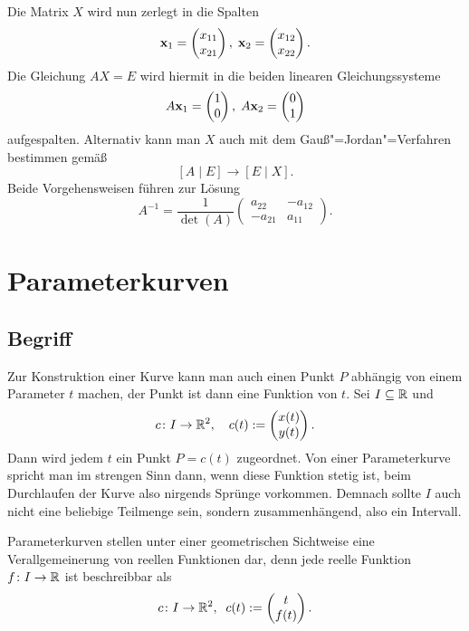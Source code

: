 Die Matrix $X$ wird nun zerlegt in die Spalten%
\[\mathbf{x}_1 = \begin{pmatrix}x_{11}\\ x_{21}\end{pmatrix},\;
\mathbf{x}_2 = \begin{pmatrix}x_{12}\\ x_{22}\end{pmatrix}.\]
Die Gleichung $AX=E$ wird hiermit in die beiden linearen
Gleichungssysteme%
\[A\mathbf{x}_1 = \begin{pmatrix}1\\ 0\end{pmatrix},\;
A\mathbf{x}_2 = \begin{pmatrix}0\\ 1\end{pmatrix}\]
aufgespalten. Alternativ kann man $X$ auch mit dem
Gauß"=Jordan"=Verfahren bestimmen gemäß%
\[[A\mid E] \rightarrow [E\mid X].\]
Beide Vorgehensweisen führen zur Lösung
\[A^{-1} = \frac{1}{\det(A)}\begin{pmatrix}
a_{22} & -a_{12}\\
-a_{21} & a_{11}
\end{pmatrix}.\]

\section{Parameterkurven}
\subsection{Begriff}
Zur Konstruktion einer Kurve kann man auch einen Punkt $P$ abhängig
von einem Parameter $t$ machen, der Punkt ist dann eine Funktion
von $t$. Sei $I\subseteq\mathbb R$ und%
\[c\colon I\to\mathbb R^2, \quad c(t):=\begin{pmatrix}x(t)\\ y(t)\end{pmatrix}.\]
Dann wird jedem $t$ ein Punkt $P=c(t)$ zugeordnet. Von einer
Parameterkurve spricht man im strengen Sinn dann, wenn diese
Funktion stetig ist, beim Durchlaufen der Kurve also nirgends
Sprünge vorkommen. Demnach sollte $I$ auch nicht eine beliebige
Teilmenge sein, sondern zusammenhängend, also ein Intervall.

Parameterkurven stellen unter einer geometrischen Sichtweise eine
Verallgemeinerung von reellen Funktionen dar, denn jede reelle
Funktion $f\colon I\to\mathbb R$ ist beschreibbar als%
\[c\colon I\to \mathbb R^2,\;\; c(t):=\begin{pmatrix}t\\ f(t)\end{pmatrix}.\]

